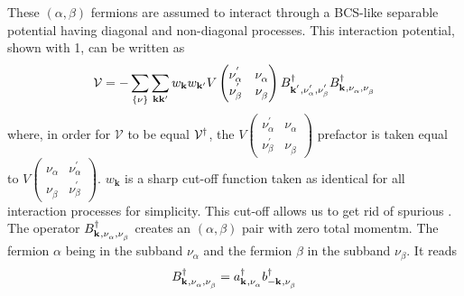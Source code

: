 \documentclass[11pt]{article} %
\begin{document}
These $(\alpha,\beta)$ fermions are assumed to interact through a BCS-like separable potential having diagonal and non-diagonal processes.  This interaction potential, shown with 1, can be written as 
\begin{equation}
\mathcal{V}=-\sum_{\{\nu\}}\sum_{\mathbf{k}\mathbf{k}'}w_{\mathbf{k}}w_{\mathbf{k}'}V 
\begin{pmatrix}
\nu_{\alpha}^{'}&\nu_{\alpha}^{}\\
\nu_{\beta}^{'}&\nu_{\beta}^{}
\end{pmatrix}
B^{\dagger}_{\mathbf{k}^{'},\nu_{\alpha}^{'},\nu_{\beta}^{'}}
B^{\dagger}_{\mathbf{k}^{ },\nu_{\alpha}^{},\nu_{\beta}^{}}
\end{equation}
where, in order for $\mathcal{V}$ to be equal  $\mathcal{V}^{\dagger}$, the $V 
\left(\begin{smallmatrix}
\nu_{\alpha}^{'}&\nu_{\alpha}^{}\\
\nu_{\beta}^{'}&\nu_{\beta}^{}
\end{smallmatrix}\right)$ prefactor is taken equal to $V 
\left(\begin{smallmatrix}
\nu_{\alpha}^{}&\nu_{\alpha}^{'}\\
\nu_{\beta}^{}&\nu_{\beta}^{'}
\end{smallmatrix}\right)$. 
$w_{\mathbf{k}}$ is a sharp cut-off function taken as identical for all interaction processes for simplicity. This cut-off allows us to get rid of spurious .  The operator   $B^{\dagger}_{\mathbf{k}^{ },\nu_{\alpha}^{},\nu_{\beta}^{}}$ creates an $(\alpha,\beta)$ pair with zero total momentm. The fermion $\alpha$ being in the subband $\nu_{\alpha}$ and the fermion $\beta$ in the subband $\nu_{\beta}$.  It reads 
\begin{equation}
B^{\dagger}_{\mathbf{k}^{ },\nu_{\alpha}^{},\nu_{\beta}^{}}=a^{\dagger}_{\mathbf{k}^{ },\nu_{\alpha}^{}}
b^{\dagger}_{-\mathbf{k}^{ },\nu_{\beta}^{}}
\end{equation}
\end{document}
